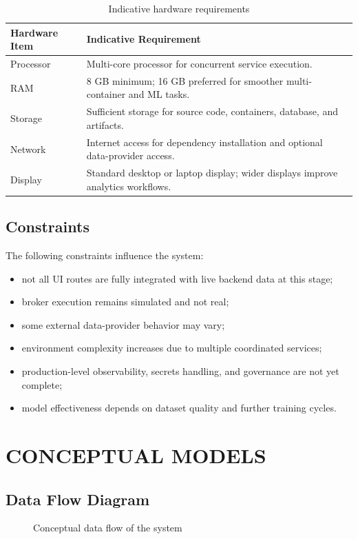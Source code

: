 \documentclass[12pt,a4paper]{report}
\begin{document}
\begin{table}[H]
\centering
\caption{Indicative hardware requirements}
\begin{tabularx}{\textwidth}{>{\raggedright\arraybackslash}p{2in} X}
\toprule
\textbf{Hardware Item} & \textbf{Indicative Requirement} \\
\midrule
Processor & Multi-core processor for concurrent service execution. \\
RAM & 8 GB minimum; 16 GB preferred for smoother multi-container and ML tasks. \\
Storage & Sufficient storage for source code, containers, database, and artifacts. \\
Network & Internet access for dependency installation and optional data-provider access. \\
Display & Standard desktop or laptop display; wider displays improve analytics workflows. \\
\bottomrule
\end{tabularx}
\end{table}

\subsection{Constraints}
The following constraints influence the system:
\begin{itemize}
\item not all UI routes are fully integrated with live backend data at this stage;
\item broker execution remains simulated and not real;
\item some external data-provider behavior may vary;
\item environment complexity increases due to multiple coordinated services;
\item production-level observability, secrets handling, and governance are not yet complete;
\item model effectiveness depends on dataset quality and further training cycles.
\end{itemize}

\section{CONCEPTUAL MODELS}
\subsection{Data Flow Diagram}
\begin{figure}[H]
\centering
{}
\caption{Conceptual data flow of the system}
\end{figure}
\end{document}

